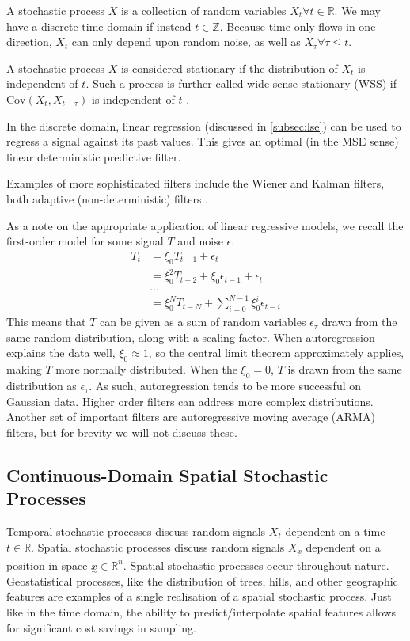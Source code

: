 \documentclass[12pt,a4paper]{article} %
\newcommand{\ve}[1]{\underset{\sim}{#1}}
\begin{document}
A stochastic process $X$ is a collection of random variables $X_t\forall t\in\mathbb{R}$. We may have a discrete time domain if instead $t\in\mathbb{Z}$. Because time only flows in one direction, $X_t$ can only depend upon random noise, as well as $X_\tau\forall\tau\leq t$.

A stochastic process $X$ is considered stationary if the distribution of $X_t$ is independent of $t$. Such a process is further called wide-sense stationary (WSS) if $\text{Cov}(X_t,X_{t-\tau})$ is independent of $t$ \cite{stochastic_wiki}.

In the discrete domain, linear regression (discussed in \ref{subsec:lse}) can be used to regress a signal against its past values. This gives an optimal (in the MSE sense) linear deterministic predictive filter.

Examples of more sophisticated filters include the Wiener and Kalman filters, both adaptive (non-deterministic) filters \cite{wiener}.

As a note on the appropriate application of linear regressive models, we recall the first-order model for some signal $T$ and noise $\epsilon$.
\begin{align*}
    T_{t}&=\xi_0T_{t-1}+\epsilon_t\\
    &=\xi_0^2T_{t-2}+\xi_0\epsilon_{t-1}+\epsilon_t\\
    &...\\
    &=\xi^N_0T_{t-N}+\sum_{i=0}^{N-1}\xi_0^i\epsilon_{t-i}
\end{align*}
This means that $T$ can be given as a sum of random variables $\epsilon_\tau$ drawn from the same random distribution, along with a scaling factor. When autoregression explains the data well, $\xi_0\approx1$, so the central limit theorem approximately applies, making $T$ more normally distributed. When the $\xi_0=0$, $T$ is drawn from the same distribution as $\epsilon_\tau$. As such, autoregression tends to be more successful on Gaussian data. Higher order filters can address more complex distributions. Another set of important filters are autoregressive moving average (ARMA) filters, but for brevity we will not discuss these.

\subsection{Continuous-Domain Spatial Stochastic Processes}
\label{subsec:continuous_processes}
Temporal stochastic processes discuss random signals $X_t$ dependent on a time $t\in\mathbb{R}$. Spatial stochastic processes discuss random signals $X_{\ve{x}}$ dependent on a position in space $\ve{x}\in\mathbb{R}^n$. Spatial stochastic processes occur throughout nature. Geostatistical processes, like the distribution of trees, hills, and other geographic features are examples of a single realisation of a spatial stochastic process. Just like in the time domain, the ability to predict/interpolate spatial features allows for significant cost savings in sampling.
\end{document}
